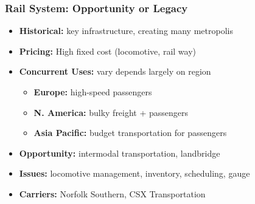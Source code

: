 \documentclass[10pt,presentation]{beamer}
\begin{document}
\begin{frame}
  \frametitle{Rail System: Opportunity or Legacy}

  \begin{itemize}
    \item \textbf{Historical:} key infrastructure, creating many metropolis
    \item \textbf{Pricing:} High fixed cost (locomotive, rail way)
    \item \textbf{Concurrent Uses:} vary depends largely on region
    \begin{itemize}
      \item \textbf{Europe:} high-speed passengers
      \item \textbf{N. America:} bulky freight + passengers
      \item \textbf{Asia Pacific:} budget transportation for passengers
    \end{itemize}
    \item \textbf{Opportunity:} \alert{intermodal transportation}, landbridge
    \item \textbf{Issues:} locomotive management, inventory, \alert{scheduling}, gauge
    \item \textbf{Carriers:} Norfolk Southern, CSX Transportation
  \end{itemize}

  \end{frame}
\end{document}
